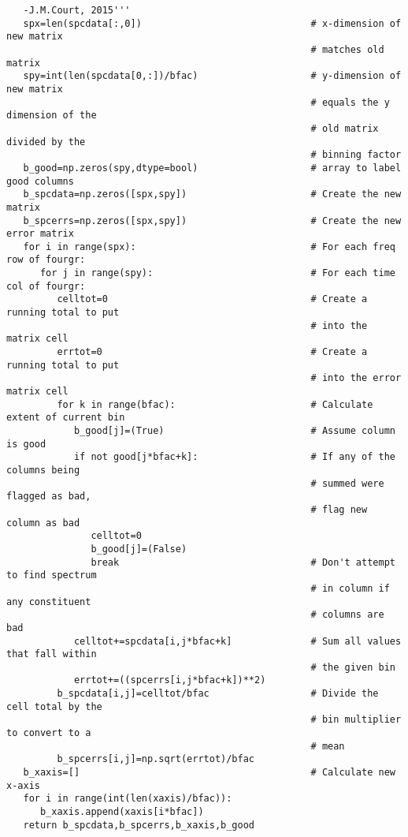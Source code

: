 \begin{verbatim}
   -J.M.Court, 2015'''
   spx=len(spcdata[:,0])                              # x-dimension of new matrix
                                                      # matches old matrix
   spy=int(len(spcdata[0,:])/bfac)                    # y-dimension of new matrix
                                                      # equals the y dimension of the
                                                      # old matrix divided by the
                                                      # binning factor
   b_good=np.zeros(spy,dtype=bool)                    # array to label good columns
   b_spcdata=np.zeros([spx,spy])                      # Create the new matrix
   b_spcerrs=np.zeros([spx,spy])                      # Create the new error matrix
   for i in range(spx):                               # For each freq row of fourgr:
      for j in range(spy):                            # For each time col of fourgr:
         celltot=0                                    # Create a running total to put
                                                      # into the matrix cell
         errtot=0                                     # Create a running total to put
                                                      # into the error matrix cell
         for k in range(bfac):                        # Calculate extent of current bin
            b_good[j]=(True)                          # Assume column is good
            if not good[j*bfac+k]:                    # If any of the columns being
                                                      # summed were flagged as bad,
                                                      # flag new column as bad
               celltot=0
               b_good[j]=(False)
               break                                  # Don't attempt to find spectrum
                                                      # in column if any constituent
                                                      # columns are bad
            celltot+=spcdata[i,j*bfac+k]              # Sum all values that fall within
                                                      # the given bin
            errtot+=((spcerrs[i,j*bfac+k])**2)
         b_spcdata[i,j]=celltot/bfac                  # Divide the cell total by the
                                                      # bin multiplier to convert to a
                                                      # mean
         b_spcerrs[i,j]=np.sqrt(errtot)/bfac
   b_xaxis=[]                                         # Calculate new x-axis
   for i in range(int(len(xaxis)/bfac)):
      b_xaxis.append(xaxis[i*bfac])
   return b_spcdata,b_spcerrs,b_xaxis,b_good


\end{verbatim}
